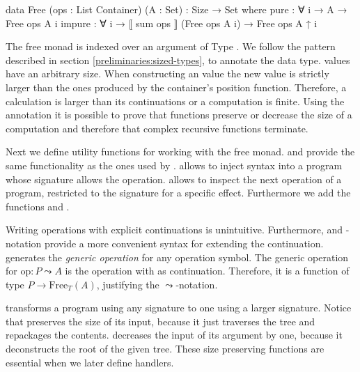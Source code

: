 \begin{code}
data Free (ops : List Container) (A : Set) : {Size} → Set where
  pure    : ∀ {i} → A → Free ops A {i}
  impure  : ∀ {i} → ⟦ sum ops ⟧ (Free ops A {i}) → Free ops A {↑ i}
\end{code}
The free monad is indexed over an argument of Type .
We follow the pattern described in section \ref{preliminaries:sized-types}, to
annotate the data type.
 values have an arbitrary size.
When constructing an  value the new value is
strictly larger than the ones produced by the container's position function.
Therefore, a calculation is larger than its continuations or a computation is
finite.
Using the annotation it is possible to prove that functions preserve or decrease
the size of a computation and therefore that complex recursive functions
terminate.

Next we define utility functions for working with the free monad.
 and  provide the same functionality as the
ones used by \textcite{DBLP:conf/haskell/WuSH14}.
 allows to inject syntax into a program whose signature allows
the operation.
 allows to inspect the next operation of a
program, restricted to the signature for a specific effect.
Furthermore we add the functions  and .

Writing operations with explicit continuations is unintuitive.
Furthermore, \AgdaFunction{>>=} and -notation provide a more
convenient syntax for extending the continuation.
 generates the \textit{generic operation} for any operation
symbol.
The generic operation for $\mathrm{op} : P \leadsto A$ is the operation with
 as continuation.
Therefore, it is a function of type $P \rightarrow \mathrm{Free}_T(A)$,
justifying the $\leadsto$-notation.

 transforms a program using any signature to one using a
larger signature.
Notice that  preserves the size of its input, because it
just traverses the tree and repackages the contents.
 decreases the input of its argument by one, because it
deconstructs the root of the given tree.
These size preserving functions are essential when we later define handlers.

